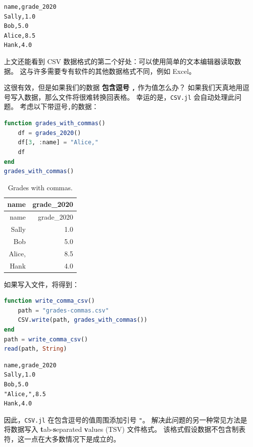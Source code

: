 \documentclass[
  notoc %
]{tufte-book}
\newcommand{\passthrough}[1]{#1}
\begin{document}
\begin{lstlisting}[language=Output]
name,grade_2020
Sally,1.0
Bob,5.0
Alice,8.5
Hank,4.0

\end{lstlisting}

上文还能看到 CSV
数据格式的第二个好处：可以使用简单的文本编辑器读取数据。
这与许多需要专有软件的其他数据格式不同，例如 Excel。

这很有效，但是如果我们的数据 \textbf{包含逗号
\passthrough{\lstinline!,!}} 作为值怎么办？
如果我们天真地用逗号写入数据，那么文件将很难转换回表格。
幸运的是，\passthrough{\lstinline!CSV.jl!} 会自动处理此问题。
考虑以下带逗号\passthrough{\lstinline!,!}的数据：

\begin{lstlisting}[language=Julia]
function grades_with_commas()
    df = grades_2020()
    df[3, :name] = "Alice,"
    df
end
grades_with_commas()
\end{lstlisting}

\hypertarget{tbl:grades_with_commas}{}
\begin{longtable}[]{@{}rr@{}}
\caption{\label{tbl:grades_with_commas}Grades with
commas.}\tabularnewline
\toprule
name & grade\_2020 \\
\midrule
\endfirsthead
\toprule
name & grade\_2020 \\
\midrule
\endhead
Sally & 1.0 \\
Bob & 5.0 \\
Alice, & 8.5 \\
Hank & 4.0 \\
\bottomrule
\end{longtable}

如果写入文件，将得到：

\begin{lstlisting}[language=Julia]
function write_comma_csv()
    path = "grades-commas.csv"
    CSV.write(path, grades_with_commas())
end
path = write_comma_csv()
read(path, String)
\end{lstlisting}

\begin{lstlisting}[language=Output]
name,grade_2020
Sally,1.0
Bob,5.0
"Alice,",8.5
Hank,4.0

\end{lstlisting}

因此，\passthrough{\lstinline!CSV.jl!} 在包含逗号的值周围添加引号
\passthrough{\lstinline!"!}。 解决此问题的另一种常见方法是将数据写入
\textbf{t}ab-\textbf{s}eparated \textbf{v}alues (TSV) 文件格式。
该格式假设数据不包含制表符，这一点在大多数情况下是成立的。
\end{document}
